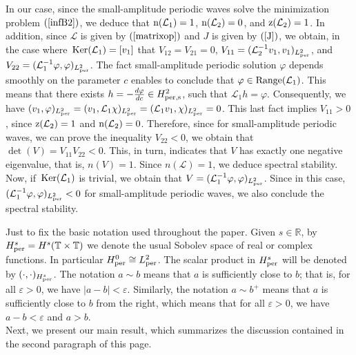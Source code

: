 \documentclass[12pt,reqno,a4paper]{amsart} %
\newcommand{\R}{{\mathbb R}}
\newcommand{\Ker}{{\rm \,Ker}}
\numberwithin{equation}{section}
\numberwithin{figure}{section}
\begin{document}
\indent In our case, since the small-amplitude periodic waves solve the minimization problem $(\ref{infB2})$, we deduce that ${\rm n}(\mathcal{L}_1)=1$, ${\rm n}(\mathcal{L}_2)=0$, and ${\rm z}(\mathcal{L}_2)=1$. In addition, since $\mathcal{L}$ is given by $(\ref{matrixop})$ and $J$ is given by $(\ref{J})$, we obtain, in the case where $\Ker(\mathcal{L}_1)=[v_1]$ that $V_{12}=V_{21}=0$, $V_{11}= ( \mathcal{L}_2^{-1}v_1, v_1)_{{L}^2_{\rm per}}$, and $V_{22}=( \mathcal{L}_1^{-1}\varphi, \varphi)_{{L}^2_{\rm per}}$. The fact small-amplitude periodic solution $\varphi$ depends smoothly on the parameter $c$ enables to conclude that $\varphi\in {\rm Range}(\mathcal{L}_1)$. This means that there exists $h=-\frac{d\varphi}{dc}\in H_{\rm per,s}^2$, such that $\mathcal{L}_1h=\varphi$. Consequently, we have $(v_1,\varphi)_{L_{\rm per}^2}=(v_1,\mathcal{L}_1\chi)_{L_{\rm per}^2}=(\mathcal{L}_1v_1,\chi)_{L_{\rm per}^2}=0$. This last fact implies $V_{11}>0$, since ${\rm z}(\mathcal{L}_2)=1$ and ${\rm n}(\mathcal{L}_2)=0$. Therefore, since for small-amplitude periodic waves, we can prove the inequality $V_{22} < 0$, we obtain that $\det(V) = V_{11} V_{22} < 0$. This, in turn, indicates that $V$ has exactly one negative eigenvalue, that is, $n(V) = 1$. Since $n(\mathcal{L}) = 1$, we deduce spectral stability. Now, if $\Ker(\mathcal{L}_1)$ is trivial, we obtain that $V=( \mathcal{L}_1^{-1}\varphi, \varphi)_{{L}^2_{\rm per}}$. Since in this case, $( \mathcal{L}_1^{-1}\varphi, \varphi)_{{L}^2_{\rm per}}<0$ for small-amplitude periodic waves, we also conclude the spectral stability. 








 Just to fix the basic notation used throughout the paper. Given $s\in\R$, by $H_{\rm per}^s=H^s(\mathbb{T}\times\mathbb{T})$ we denote the usual Sobolev space of real or complex functions. In particular $H_{\rm per}^0\cong L_{\rm per}^2$. The scalar product in $H_{\rm per}^s$ will be denoted by $(\cdot,\cdot)_{H_{\rm per}^s}$. The notation $a \sim b$ means that $a$ is sufficiently close to $b$; that is, for all $\varepsilon > 0$, we have $|a - b| < \varepsilon$. Similarly, the notation $a \sim b^{+}$ means that $a$ is sufficiently close to $b$ from the right, which means that for all $\varepsilon > 0$, we have $a - b < \varepsilon$ and $a > b$. \\
 \indent Next, we present our main result, which summarizes the discussion contained in the second paragraph of this page.
\end{document}
